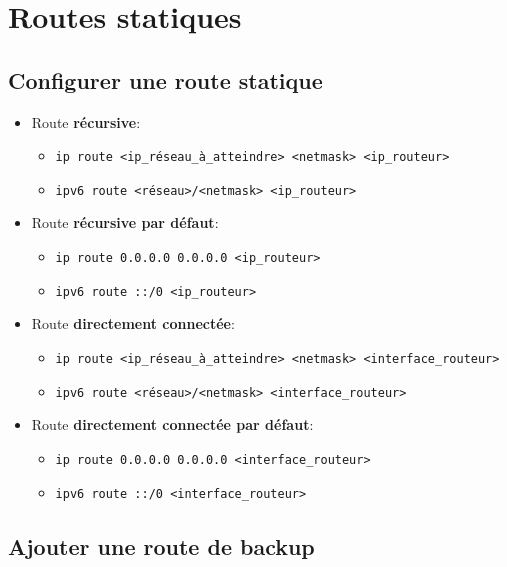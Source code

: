 \documentclass[a4paper]{article}
\begin{document}
\section{Routes statiques}





\subsection{Configurer une route statique}



\begin{itemize}
    \item Route \textbf{récursive}:
    \begin{itemize}
        \item \texttt{ip route <ip\_réseau\_à\_atteindre> <netmask> <ip\_routeur>}
        \item \texttt{ipv6 route <réseau>/<netmask> <ip\_routeur>}
    \end{itemize}
    \item Route \textbf{récursive par défaut}:
    \begin{itemize}
        \item \texttt{ip route 0.0.0.0 0.0.0.0 <ip\_routeur>}
        \item \texttt{ipv6 route ::/0 <ip\_routeur>}
    \end{itemize}
    \item Route \textbf{directement connectée}:
    \begin{itemize}
        \item \texttt{ip route <ip\_réseau\_à\_atteindre> <netmask> <interface\_routeur>}
        \item \texttt{ipv6 route <réseau>/<netmask> <interface\_routeur>}
    \end{itemize}
    \item Route \textbf{directement connectée par défaut}:    
    \begin{itemize}
        \item \texttt{ip route 0.0.0.0 0.0.0.0 <interface\_routeur>}
        \item \texttt{ipv6 route ::/0 <interface\_routeur>}
    \end{itemize}
\end{itemize}





\subsection{Ajouter une route de backup}
\end{document}
